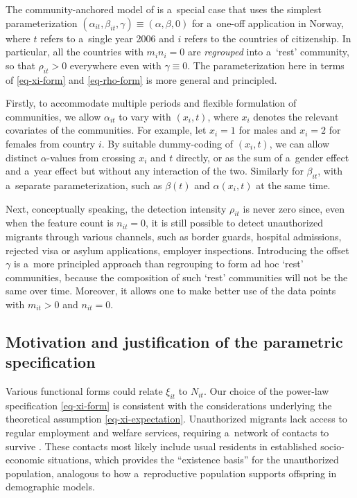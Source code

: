 The community-anchored model of \citet{Zhang2008} is a~special case that uses the simplest parameterization $(\alpha_{it}, \beta_{it}, \gamma) \equiv (\alpha, \beta, 0)$ for a~one-off application in Norway, where $t$ refers to a~single year 2006 and $i$ refers to the countries of citizenship. In particular, all the countries with $m_i n_i =0$ are \emph{regrouped} into a~`rest' community, so that $\rho_{it} >0$ everywhere even with $\gamma \equiv 0$. The parameterization here in terms of \eqref{eq-xi-form} and \eqref{eq-rho-form} is more general and principled.

Firstly, to accommodate multiple periods and flexible formulation of communities, we allow $\alpha_{it}$ to vary with $(x_i, t)$, where $x_i$ denotes the relevant covariates of the communities. For example, let $x_i =1$ for males and $x_i = 2$ for females from country $i$. By suitable dummy-coding of $(x_i, t)$, we can allow distinct $\alpha$-values from crossing $x_i$ and $t$ directly, or as the sum of a~gender effect and a~year effect but without any interaction of the two. Similarly for $\beta_{it}$, with a~separate parameterization, such as $\beta(t)$ and $\alpha(x_i, t)$ at the same time. 

Next, conceptually speaking, the detection intensity $\rho_{it}$ is never zero since, even when the feature count is $n_{it} = 0$, it is still possible to detect unauthorized migrants through various channels, such as border guards, hospital admissions, rejected visa or asylum applications, employer
inspections. Introducing the offset $\gamma$ is a~more principled approach than regrouping to form ad hoc `rest' communities, because the composition of such `rest' communities will not be the same over time. Moreover, it allows one to make better use of the data points with $m_{it} >0$ and $n_{it} =0$.


\subsection{Motivation and justification of the parametric specification}\label{sec-emp-just}

Various functional forms could relate $\xi_{it}$ to $N_{it}$. Our choice of the power-law specification \eqref{eq-xi-form} is consistent with the 
considerations underlying the theoretical assumption \eqref{eq-xi-expectation}. Unauthorized migrants lack access to regular employment and welfare services, requiring a~network of contacts to survive \citep{Hagan1998, Engbersen2001}. These contacts most likely include usual residents in established socio-economic situations, which provides the ``existence basis'' for the unauthorized population, analogous to how a~reproductive
population supports offspring in demographic models.

